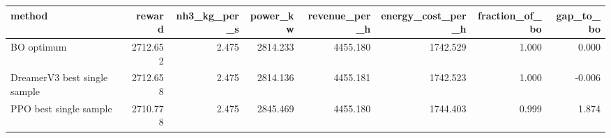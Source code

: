 \begin{tabular}{lrrrrrrr}
\toprule
method & reward & nh3_kg_per_s & power_kw & revenue_per_h & energy_cost_per_h & fraction_of_bo & gap_to_bo \\
\midrule
BO optimum & 2712.652 & 2.475 & 2814.233 & 4455.180 & 1742.529 & 1.000 & 0.000 \\
DreamerV3 best single sample & 2712.658 & 2.475 & 2814.136 & 4455.181 & 1742.523 & 1.000 & -0.006 \\
PPO best single sample & 2710.778 & 2.475 & 2845.469 & 4455.180 & 1744.403 & 0.999 & 1.874 \\
\bottomrule
\end{tabular}
